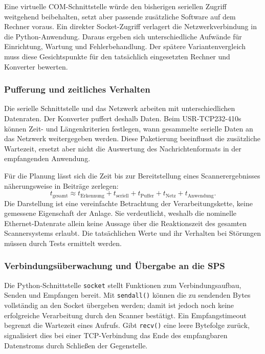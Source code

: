 Eine virtuelle COM-Schnittstelle würde den bisherigen seriellen Zugriff weitgehend beibehalten, setzt aber passende zusätzliche Software auf dem Rechner voraus. Ein direkter Socket-Zugriff verlagert die Netzwerkverbindung in die Python-Anwendung. Daraus ergeben sich unterschiedliche Aufwände für Einrichtung, Wartung und Fehlerbehandlung. Der spätere Variantenvergleich muss diese Gesichtspunkte für den tatsächlich eingesetzten Rechner und Konverter bewerten.

\subsubsection{Pufferung und zeitliches Verhalten}

Die serielle Schnittstelle und das Netzwerk arbeiten mit unterschiedlichen Datenraten. Der Konverter puffert deshalb Daten. Beim USR-TCP232-410s können Zeit- und Längenkriterien festlegen, wann gesammelte serielle Daten an das Netzwerk weitergegeben werden. Diese Paketierung beeinflusst die zusätzliche Wartezeit, ersetzt aber nicht die Auswertung des Nachrichtenformats in der empfangenden Anwendung. \cite[Abschn.~2.3.4]{usr410s_grundlagen}

Für die Planung lässt sich die Zeit bis zur Bereitstellung eines Scannerergebnisses näherungsweise in Beiträge zerlegen:
\begin{equation}
  t_{\mathrm{gesamt}} \approx t_{\mathrm{Erkennung}} + t_{\mathrm{seriell}}
  + t_{\mathrm{Puffer}} + t_{\mathrm{Netz}} + t_{\mathrm{Anwendung}}.
  \label{eq:scanner_latenz}
\end{equation}
Die Darstellung ist eine vereinfachte Betrachtung der Verarbeitungskette, keine gemessene Eigenschaft der Anlage. Sie verdeutlicht, weshalb die nominelle Ethernet-Datenrate allein keine Aussage über die Reaktionszeit des gesamten Scannersystems erlaubt. Die tatsächlichen Werte und ihr Verhalten bei Störungen müssen durch Tests ermittelt werden.

\subsubsection{Verbindungsüberwachung und Übergabe an die SPS}

Die Python-Schnittstelle \texttt{socket} stellt Funktionen zum Verbindungsaufbau, Senden und Empfangen bereit. Mit \texttt{sendall()} können die zu sendenden Bytes vollständig an den Socket übergeben werden; damit ist jedoch noch keine erfolgreiche Verarbeitung durch den Scanner bestätigt. Ein Empfangstimeout begrenzt die Wartezeit eines Aufrufs. Gibt \texttt{recv()} eine leere Bytefolge zurück, signalisiert dies bei einer TCP-Verbindung das Ende des empfangbaren Datenstroms durch Schließen der Gegenstelle. \cite{python_socket_api}

